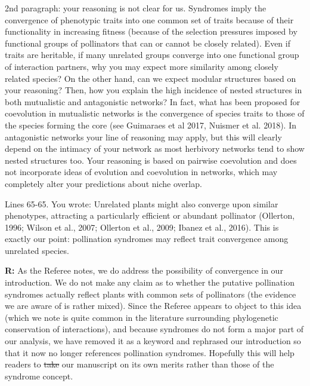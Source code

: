 \documentclass[12pt]{letter}
\newenvironment{refquote}{\bigskip \begin{it}}{\end{it}\smallskip}
\providecommand{\DIFadd}[1]{{\protect\color{blue}\uwave{#1}}} %
\providecommand{\DIFdel}[1]{{\protect\color{red}\sout{#1}}}                      %
\providecommand{\DIFaddbegin}{} %
\providecommand{\DIFaddend}{} %
\providecommand{\DIFdelbegin}{} %
\providecommand{\DIFdelend}{} %
\newcommand{\DIFscaledelfig}{0.5}
\newlength{\DIFdelgraphicswidth} %
\newlength{\DIFdelgraphicsheight} %
\newcommand{\DIFaddincludegraphics}[2][]{{\color{blue}\fbox{\DIFOincludegraphics[#1]{#2}}}} %
\newcommand{\DIFdelincludegraphics}[2][]{%
\sbox{\DIFdelgraphicsbox}{\DIFOincludegraphics[#1]{#2}}%
\settoboxwidth{\DIFdelgraphicswidth}{\DIFdelgraphicsbox} %
\settoboxtotalheight{\DIFdelgraphicsheight}{\DIFdelgraphicsbox} %
\scalebox{\DIFscaledelfig}{%
\parbox[b]{\DIFdelgraphicswidth}{\usebox{\DIFdelgraphicsbox}\\[-\baselineskip] \rule{\DIFdelgraphicswidth}{0em}}\llap{\resizebox{\DIFdelgraphicswidth}{\DIFdelgraphicsheight}{%
\setlength{\unitlength}{\DIFdelgraphicswidth}%
\begin{picture}(1,1)%
\thicklines\linethickness{2pt} %
{\color[rgb]{1,0,0}\put(0,0){\framebox(1,1){}}}%
{\color[rgb]{1,0,0}\put(0,0){\line( 1,1){1}}}%
{\color[rgb]{1,0,0}\put(0,1){\line(1,-1){1}}}%
\end{picture}%
}\hspace*{3pt}}} %
} %
\DeclareRobustCommand{\DIFaddbegin}{\DIFOaddbegin \let\includegraphics\DIFaddincludegraphics} %
\DeclareRobustCommand{\DIFaddend}{\DIFOaddend \let\includegraphics\DIFOincludegraphics} %
\DeclareRobustCommand{\DIFdelbegin}{\DIFOdelbegin \let\includegraphics\DIFdelincludegraphics} %
\DeclareRobustCommand{\DIFdelend}{\DIFOaddend \let\includegraphics\DIFOincludegraphics} %
\begin{document}
		\begin{refquote}
			2nd paragraph: your reasoning is not clear for us. Syndromes imply the convergence of phenotypic traits into one common set of traits because of their functionality in increasing fitness (because of the selection pressures imposed by functional groups of pollinators that can or cannot be closely related). Even if traits are heritable, if many unrelated groups converge into one functional group of interaction partners, why you may expect more similarity among closely related species? On the other hand, can we expect modular structures based on your reasoning? Then, how you explain the high incidence of nested structures in both mutualistic and antagonistic networks? In fact, what has been proposed for coevolution in mutualistic networks is the convergence of species traits to those of the species forming the core (see Guimaraes et al 2017, Nuismer et al. 2018). In antagonistic networks your line of reasoning may apply, but this will clearly depend on the intimacy of your network as most herbivory networks tend to show nested structures too. Your reasoning is based on pairwise coevolution and does not incorporate ideas of evolution and coevolution in networks, which may completely alter your predictions about niche overlap.
		\end{refquote}

		\begin{refquote}
			Lines 65-65. You wrote: Unrelated plants might also converge upon similar phenotypes, attracting a particularly efficient or abundant pollinator (Ollerton, 1996; Wilson et al., 2007; Ollerton et al., 2009; Ibanez et al., 2016). This is exactly our point: pollination syndromes may reflect trait convergence among unrelated species.
		\end{refquote}


		\textbf{R:} As the Referee notes, we do address the possibility of convergence in our introduction. We do not make any claim as to whether the putative pollination syndromes actually reflect plants with common sets of pollinators (the evidence we are aware of is rather mixed). Since the Referee appears to object to this idea (which we \DIFaddbegin \DIFadd{nevertheless }\DIFaddend note is quite common in the literature surrounding phylogenetic conservation of interactions), and because syndromes do not form a major part of our analysis, we have removed it as a keyword and rephrased our introduction so that it now no longer references pollination syndromes. Hopefully this will help readers to \DIFdelbegin \DIFdel{take }\DIFdelend \DIFaddbegin \DIFadd{evaluate }\DIFaddend our manuscript on its own merits rather than those of the syndrome concept.
\end{document}
